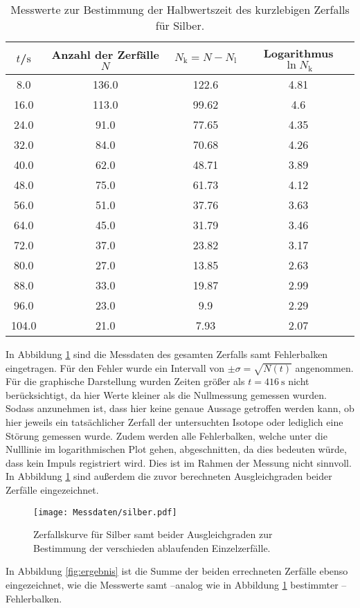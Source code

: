 \begin{table}
	\centering
	\caption{Messwerte zur Bestimmung der Halbwertszeit des kurzlebigen Zerfalls für Silber.}
	\label{tab:silver1}
\begin{tabular}{cccc}
	\toprule
$t$/$\si{\second}$ & Anzahl der Zerfälle $N$&$N_\mathrm{k}=N-N_\mathrm{l}$ & Logarithmus $\ln{N_\mathrm{k}}$ \\
\midrule
8.0 & 136.0 & 122.6 & 4.81 \\
16.0 & 113.0 & 99.62 & 4.6 \\
24.0 & 91.0 & 77.65 & 4.35 \\
32.0 & 84.0 & 70.68 & 4.26 \\
40.0 & 62.0 & 48.71 & 3.89 \\
48.0 & 75.0 & 61.73 & 4.12 \\
56.0 & 51.0 & 37.76 & 3.63 \\
64.0 & 45.0 & 31.79 & 3.46 \\
72.0 & 37.0 & 23.82 & 3.17 \\
80.0 & 27.0 & 13.85 & 2.63 \\
88.0 & 33.0 & 19.87 & 2.99 \\
96.0 & 23.0 & 9.9 & 2.29 \\
104.0 & 21.0 & 7.93 & 2.07 \\
\bottomrule
\end{tabular}
\end{table}
In Abbildung \ref{fig:silber} sind die Messdaten des gesamten Zerfalls samt Fehlerbalken eingetragen.
Für den Fehler wurde ein Intervall von $\pm \sigma=\sqrt{N(t)}$ angenommen.
Für die graphische Darstellung wurden Zeiten größer als $t=\SI{416}{\second}$ nicht berücksichtigt, da hier Werte kleiner als die Nullmessung gemessen wurden. Sodass anzunehmen ist, dass hier keine genaue Aussage getroffen werden kann, ob hier jeweils ein tatsächlicher Zerfall der untersuchten Isotope oder lediglich eine Störung gemessen wurde.
Zudem werden alle Fehlerbalken, welche unter die Nulllinie im logarithmischen Plot gehen, abgeschnitten, da dies bedeuten würde, dass kein Impuls registriert wird. Dies ist im Rahmen der Messung nicht sinnvoll.
In Abbildung \ref{fig:silber} sind außerdem die zuvor berechneten Ausgleichgraden beider Zerfälle eingezeichnet.

\begin{figure}
  \centering
  \texttt{[image: Messdaten/silber.pdf]}
  \caption{Zerfallskurve für Silber samt beider Ausgleichgraden zur Bestimmung der verschieden ablaufenden Einzelzerfälle.}
  \label{fig:silber}
\end{figure}
In Abbildung \ref{fig:ergebnis} ist die Summe der beiden errechneten Zerfälle ebenso eingezeichnet, wie die Messwerte samt --analog wie in Abbildung \ref{fig:silber} bestimmter -- Fehlerbalken.

